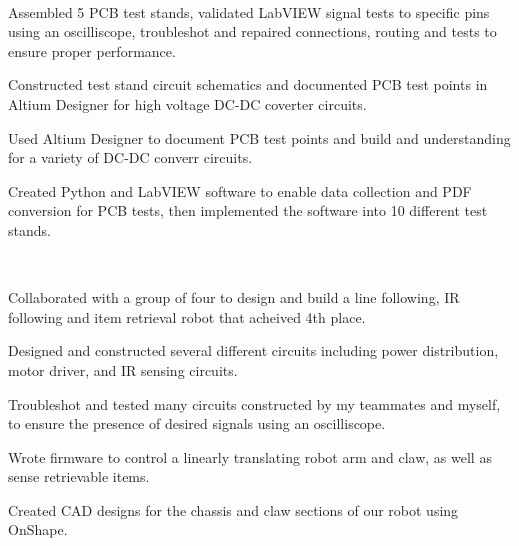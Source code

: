 \documentclass[a4paper]{MagicalCV}
\begin{document}
\begin{minipage}[t]{0.66\textwidth} 


 \\
\begin{tightemize}
\item Assembled 5 PCB test stands, validated LabVIEW signal tests to specific pins using an oscilliscope, troubleshot and repaired connections, routing and tests to ensure proper performance.
\item Constructed test stand circuit schematics and documented PCB test points in Altium Designer for high voltage DC-DC coverter circuits.  
\item Used Altium Designer to document PCB test points and build and understanding for a variety of DC-DC converr circuits.
\item Created Python and LabVIEW software to enable data collection and PDF conversion for PCB tests, then implemented the software into 10 different test stands. 
\end{tightemize}
\sectionsep



 \\
\begin{tightemize}
    \item Collaborated with a group of four to design and build a line following, IR following and item retrieval robot that acheived 4th place.
    \item Designed and constructed several different circuits including power distribution, motor driver, and IR sensing circuits.
    \item Troubleshot and tested many circuits constructed by my teammates and myself, to ensure the presence of desired signals using an oscilliscope.
    \item Wrote firmware to control a linearly translating robot arm and claw, as well as sense retrievable items. 
    \item Created CAD designs for the chassis and claw sections of our robot using OnShape.  
\end{tightemize}
\sectionsep


\end{minipage}
\end{document}
